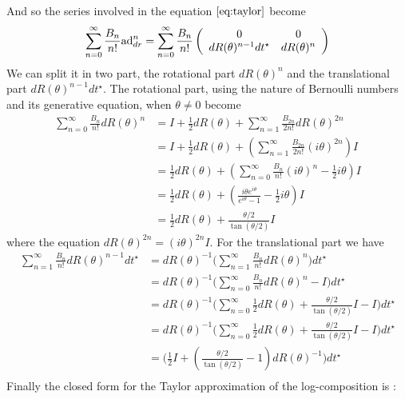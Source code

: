 And so the series involved in the equation $\ref{eq:taylor}$ become
\begin{align*}
\sum_{n=0}^{\infty} \frac{B_{n}}{n!} \text{ad}_{dr}^{ n} 
=
\sum_{n=0}^{\infty} \frac{B_{n}}{n!} \left (
\begin{array} {c c}
0            &  0        \\
dR(\theta)^{n-1}dt^{\star}      &  dR(\theta)^{n}      
\end{array}
\right ) 
\end{align*}
We can split it in two part, the rotational part $dR(\theta)^{n}$ and the translational part $dR(\theta)^{n-1}dt^{\star}$. The rotational part, using the nature of Bernoulli numbers and its generative equation, when $\theta \neq 0$ become
\begin{align*}
\sum_{n=0}^{\infty} \frac{B_{n}}{n!} dR(\theta)^{n}  
&=
I + \frac{1}{2}dR(\theta) + \sum_{n=1}^{\infty}\frac{B_{2n}}{2n!} dR(\theta)^{2n}  \\
&=
I + \frac{1}{2}dR(\theta) + (\sum_{n=1}^{\infty}\frac{B_{2n}}{2n!} (i \theta)^{2n})I  \\
&=
\frac{1}{2}dR(\theta) + (\sum_{n=0}^{\infty}\frac{B_{n}}{n!}(i \theta)^{n} - \frac{1}{2} i\theta) I  \\
&=
\frac{1}{2}dR(\theta) + (\frac{i\theta e^{i\theta}}{e^{i\theta} - 1} - \frac{1}{2} i\theta) I  \\
&=
\frac{1}{2}dR(\theta) +  \frac{\theta /2}{\tan(\theta/2)} I  
\end{align*}
where the equation $dR(\theta)^{2n} =  (i \theta)^{2n}I  $. For the translational part we have
\begin{align*}
\sum_{n=1}^{\infty} \frac{B_{n}}{n!} dR(\theta)^{n-1} dt^{\star} 
&=
dR(\theta)^{-1} \Big(\sum_{n=1}^{\infty}\frac{B_{n}}{n!} dR(\theta)^{n}\Big)dt^{\star} \\
&=
dR(\theta)^{-1}  \Big(\sum_{n=0}^{\infty}\frac{B_{n}}{n!} dR(\theta)^{n} - I \Big)dt^{\star}  \\
&=
dR(\theta)^{-1}  \Big(\sum_{n=0}^{\infty} \frac{1}{2}dR(\theta) +  \frac{\theta /2}{\tan(\theta/2)} I  - I \Big) dt^{\star} \\ 
&=
dR(\theta)^{-1}  \Big(\sum_{n=0}^{\infty} \frac{1}{2}dR(\theta) +  \frac{\theta /2}{\tan(\theta/2)} I  - I \Big)dt^{\star} \\
&=
\Big(\frac{1}{2} I + (\frac{\theta /2}{\tan(\theta/2)} - 1)dR(\theta)^{-1}   \Big) dt^{\star}    \\
\end{align*}
Finally the closed form for the Taylor approximation of the log-composition is \cite{vercauteren2014preprint}:
